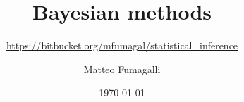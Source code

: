 \documentclass{beamer}
\institute{\texttt{[image: ../Probability/Imperial\_1\_Pantone\_solid.eps]}}
\title{Bayesian methods}
\subtitle{\url{https://bitbucket.org/mfumagal/statistical_inference}}
\author{Matteo Fumagalli}
\date{\today}
\begin{document}
	\frame{\titlepage}

	

	

	

	

	

	

	

	

	
\end{document}
